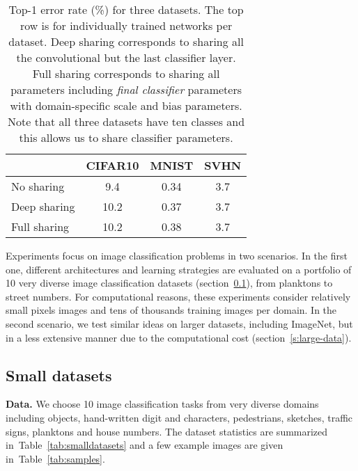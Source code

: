 \documentclass[10pt,twocolumn,letterpaper]{article}
\renewcommand{\paragraph}[1]{\par\medskip\noindent\textbf{#1}}
\begin{document}
 \begin{table}[t]
	\centering
	\begin{tabular}{lccc}
		\toprule
		& CIFAR10 & MNIST & SVHN\\
		\midrule
		No sharing & 9.4 & 0.34 & 3.7\\
		Deep sharing & 10.2 & 0.37 & 3.7\\
		Full sharing & 10.2 & 0.38 & 3.7\\
		\bottomrule
	\end{tabular}
	\caption{Top-1 error rate (\%) for three datasets. The top row is for individually trained networks per dataset. Deep sharing corresponds to sharing all the convolutional but the last classifier layer. Full sharing corresponds to sharing all parameters including \emph{final classifier} parameters with domain-specific scale and bias parameters. Note that all three datasets have ten classes and this allows us to share classifier parameters.}
	\label{tab:shareclassifier}
\end{table} 
Experiments focus on image classification problems in two scenarios. In the first one, different architectures and learning strategies are evaluated on a portfolio of 10 very diverse image classification datasets (section~\ref{s:small}), from planktons to street numbers. For computational reasons, these experiments consider relatively small  pixels images and tens of thousands training images per domain. In the second scenario, we test similar ideas on larger datasets, including ImageNet, but in a less extensive manner due to the computational cost (section~\ref{s:large-data}).

\subsection{Small datasets}\label{s:small}

\paragraph{Data.} We choose 10 image classification tasks from very diverse domains including objects, hand-written digit and characters, pedestrians, sketches, traffic signs, planktons and house numbers. The dataset statistics are summarized in~Table~\ref{tab:smalldatasets} and a few example images are given in~Table~\ref{tab:samples}.
\end{document}
